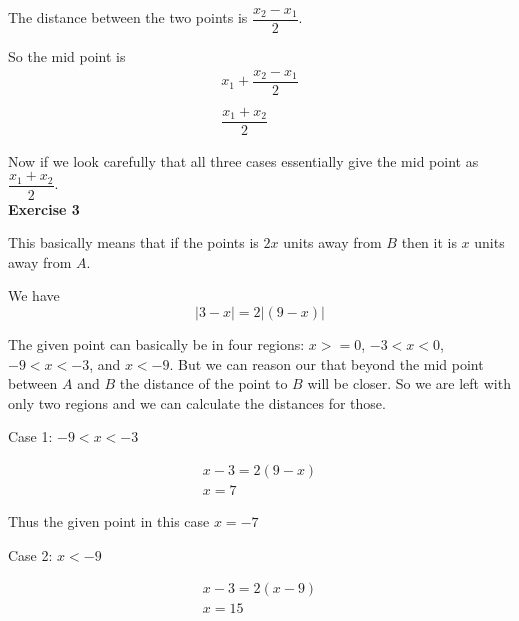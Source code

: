 \documentclass[10pt]{article}
\begin{document}
\begin{center}
\end{center}

The distance between the two points is $\dfrac{x_2 - x_1}{2}$.

So the mid point is 
\begin{gather*}
    x_1 + \dfrac{x_2 - x_1}{2}\\\\
    \dfrac{x_1 + x_2}{2}
\end{gather*}

Now if we look carefully that all three cases essentially give the mid point as $\dfrac{x_1 + x_2}{2}$.\\

\textbf{Exercise 3}

This basically means that if the points is $2x$ units away from $B$ then it is $x$ units away from $A$.

We have
\[
|3 - x| = 2|(9 - x)|
\]

The given point can basically be in four regions: $x >= 0$, $-3 < x < 0$, $-9 < x < -3$, and $x < -9$. But 
we can reason our that beyond the mid point between $A$ and $B$ the distance of the point to $B$ will be closer.
So we are left with only two regions and we can calculate the distances for those. 

Case 1: $-9 < x < -3$

\begin{gather*}
    x - 3 = 2(9 - x)\\
    x = 7
\end{gather*}

Thus the given point in this case $x = -7$

Case 2: $x < -9$

\begin{gather*}
    x - 3 = 2(x - 9)\\
    x = 15
\end{gather*}
\end{document}
